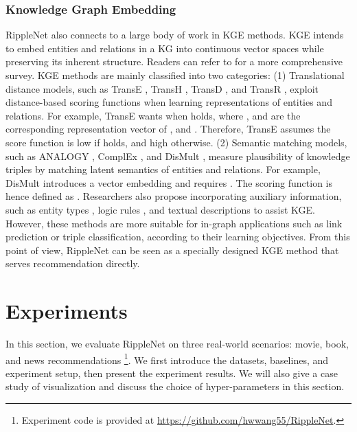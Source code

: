 \documentclass[sigconf]{acmart}
\begin{document}
		\subsubsection{Knowledge Graph Embedding}
		\label{sec:kge}
			RippleNet also connects to a large body of work in KGE methods\cite{bordes2013translating,wang2014knowledge,ji2015knowledge,lin2015learning,wang2018graphgan,nickel2016holographic,trouillon2016complex,yang2015embedding}.
			KGE intends to embed entities and relations in a KG into continuous vector spaces while preserving its inherent structure.
			Readers can refer to \cite{wang2017knowledge} for a more comprehensive survey.
			KGE methods are mainly classified into two categories:
			(1) Translational distance models, such as TransE \cite{bordes2013translating}, TransH \cite{wang2014knowledge}, TransD \cite{ji2015knowledge}, and TransR \cite{lin2015learning}, exploit distance-based scoring functions when learning representations of entities and relations.
			For example, TransE \cite{bordes2013translating} wants  when  holds, where ,  and  are the corresponding representation vector of ,  and .
			Therefore, TransE assumes the score function  is low if  holds, and high otherwise.
			(2) Semantic matching models, such as ANALOGY \cite{nickel2016holographic}, ComplEx \cite{trouillon2016complex}, and DisMult \cite{yang2015embedding}, measure plausibility of knowledge triples by matching latent semantics of entities and relations.
			For example, DisMult \cite{yang2015embedding} introduces a vector embedding  and requires .
			The scoring function is hence defined as .
			Researchers also propose incorporating auxiliary information, such as entity types \cite{xie2016representation}, logic rules \cite{rocktaschel2015injecting}, and textual descriptions \cite{zhong2015aligning} to assist KGE.
			However, these methods are more suitable for in-graph applications such as link prediction or triple classification, according to their learning objectives.
			From this point of view, RippleNet can be seen as a specially designed KGE method that serves recommendation directly.


\section{Experiments}\label{section_experiments}
	In this section, we evaluate RippleNet on three real-world scenarios: movie, book, and news recommendations
\footnote{Experiment code is provided at \url{https://github.com/hwwang55/RippleNet}.}.
	We first introduce the datasets, baselines, and experiment setup, then present the experiment results.
	We will also give a case study of visualization and discuss the choice of hyper-parameters in this section.
	
\end{document}
